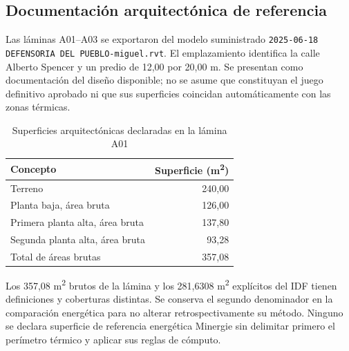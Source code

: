 \subsection{Documentación arquitectónica de referencia}
\label{sec:planos-revit}
Las láminas A01--A03 se exportaron del modelo suministrado \texttt{2025-06-18 DEFENSORIA DEL PUEBLO-miguel.rvt}. El emplazamiento identifica la calle Alberto Spencer y un predio de 12,00 por 20,00 m. Se presentan como documentación del diseño disponible; no se asume que constituyan el juego definitivo aprobado ni que sus superficies coincidan automáticamente con las zonas térmicas.
\begin{table}[htbp]\centering
\caption{Superficies arquitectónicas declaradas en la lámina A01}
\begin{tabular}{lr}\toprule
Concepto & Superficie (m\textsuperscript{2}) \\ \midrule
Terreno & 240,00 \\
Planta baja, área bruta & 126,00 \\
Primera planta alta, área bruta & 137,80 \\
Segunda planta alta, área bruta & 93,28 \\
Total de áreas brutas & 357,08 \\
\bottomrule\end{tabular}
\end{table}
Los 357,08 m\textsuperscript{2} brutos de la lámina y los 281,6308 m\textsuperscript{2} explícitos del IDF tienen definiciones y coberturas distintas. Se conserva el segundo denominador en la comparación energética para no alterar retrospectivamente su método. Ninguno se declara superficie de referencia energética Minergie sin delimitar primero el perímetro térmico y aplicar sus reglas de cómputo.

